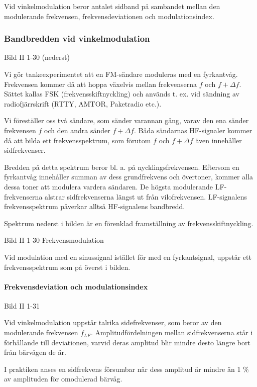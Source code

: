Vid vinkelmodulation beror antalet sidband på sambandet mellan den modulerande frekvensen,
frekvensdeviationen och modulationsindex.

\subsubsection{Bandbredden vid vinkelmodulation}

Bild II 1-30 (nederst)

Vi gör tankeexperimentet att en FM-sändare moduleras med en fyrkantvåg. Frekvensen
kommer då att hoppa växelvis mellan frekvenserna \(f\) och \(f + \Delta f\). Sättet kallas FSK
(frekvensskiftnyckling) och används t. ex. vid sändning av radiofjärrskrift (RTTY, AMTOR,
Paketradio etc.).

Vi föreställer oss två sändare, som sänder varannan gång, varav den ena sänder frekvensen
\(f\) och den andra sänder \(f + \Delta f\). Båda sändarnas HF-signaler kommer då att bilda
ett frekvensspektrum, som förutom \(f\) och \(f + \Delta f\) även innehåller sidfrekvenser.

Bredden på detta spektrum beror bl. a. på nycklingsfrekvensen. Eftersom en fyrkantvåg
innehåller summan av dess grundfrekvens och övertoner, kommer alla dessa toner att
modulera vardera sändaren. De högsta modulerande LF-frekvenserna alstrar sidfrekvenserna
längst ut från vilofrekvensen. LF-signalens frekvensspektrum påverkar alltså
HF-signalens bandbredd.

Spektrum nederst i bilden är en förenklad framställning av frekvensskiftnyckling.

Bild II 1-30 Frekvensmodulation

Vid modulation med en sinussignal istället för med en fyrkantsignal, uppstår ett
frekvensspektrum som på överst i bilden.

\paragraph{Frekvensdeviation och modulationsindex}

Bild II 1-31

Vid vinkelmodulation uppstår talrika sidefrekvenser, som beror av den modulerande
frekvensen \(f_{LF}\). Amplitudfördelningen mellan sidfrekvenserna står i förhållande till
deviationen, varvid deras amplitud blir mindre desto längre bort från bärvågen de är.

I praktiken anses en sidfrekvens försumbar när dess amplitud är mindre än 1 \% av
amplituden för omodulerad bärvåg.

